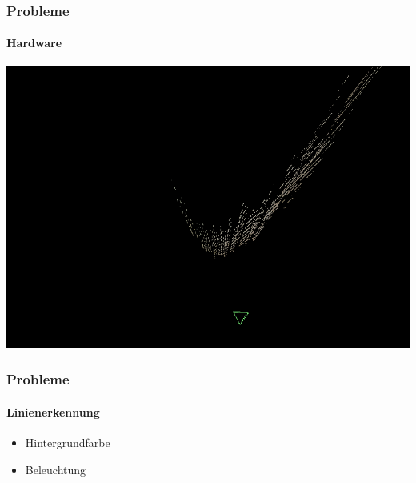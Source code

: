 \documentclass[xcolor=dvipsnames]{beamer}
\begin{document}
\begin{frame}
	\frametitle{Probleme}
	\framesubtitle{Hardware}

	\includegraphics[width=\linewidth]{includes/krumm.png}

\end{frame}


\begin{frame}
	\frametitle{Probleme}
	\framesubtitle{Linienerkennung}

	\begin{itemize}
		\item Hintergrundfarbe
		\item Beleuchtung
	\end{itemize}

\end{frame}

\end{document}
